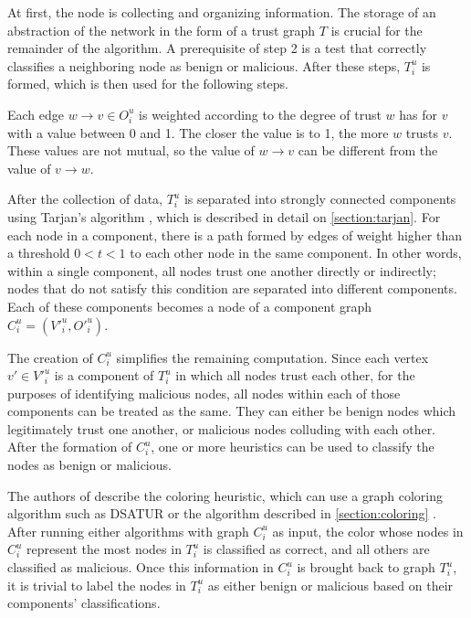 \documentclass[conference]{IEEEtran}
\begin{document}



At first, the node is collecting and organizing information.
The storage of an abstraction of the network in the form of a trust graph $T$ is crucial for the remainder of the algorithm.
A prerequisite of step 2 is a test that correctly classifies a neighboring node as benign or malicious.
After these steps, $T^u_i$ is formed, which is then used for the following steps.

Each edge $w \rightarrow v \in O^u_i$ is weighted according to the degree of trust $w$ has for $v$ with a value between 0 and 1.
The closer the value is to 1, the more $w$ trusts $v$.
These values are not mutual, so the value of $w \rightarrow v$ can be different from the value of $v \rightarrow w$.

After the collection of data, $T^u_i$ is separated into strongly connected components using Tarjan's algorithm \cite{tarjan1972depth}, which is described in detail on \autoref{section:tarjan}.
For each node in a component, there is a path formed by edges of weight higher than a threshold $0 < t < 1$ to each other node in the same component.
In other words, within a single component, all nodes trust one another directly or indirectly; nodes that do not satisfy this condition are separated into different components.
Each of these components becomes a node of a component graph $C^u_i = (V'^u_i, O'^u_i)$.

The creation of $C^u_i$ simplifies the remaining computation.
Since each vertex $v' \in V'^u_i$ is a component of $T^u_i$ in which all nodes trust each other, for the purposes of identifying malicious nodes, all nodes within each of those components can be treated as the same.
They can either be benign nodes which legitimately trust one another, or malicious nodes colluding with each other.
After the formation of $C^u_i$, one or more heuristics can be used to classify the nodes as benign or malicious.

The authors of \cite{vernize2015malicious} describe the coloring heuristic, which can use a graph coloring algorithm such as DSATUR \cite{brelaz1979new} or the algorithm described in \autoref{section:coloring} \cite{mittal2011graph}.
After running either algorithms with graph $C^u_i$ as input, the color whose nodes in $C^u_i$ represent the most nodes in $T^u_i$ is classified as correct, and all others are classified as malicious.
Once this information in $C^u_i$ is brought back to graph $T^u_i$, it is trivial to label the nodes in $T^u_i$ as either benign or malicious based on their components' classifications.
\end{document}
